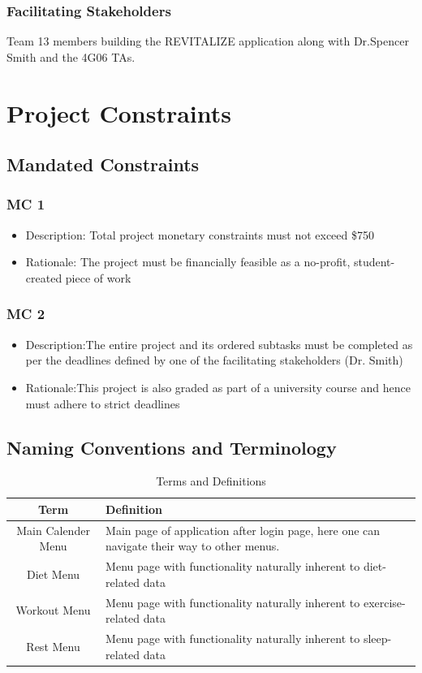 \documentclass[12pt,letterpaper]{article}
\begin{document}
\subsubsection{Facilitating Stakeholders}
Team 13 members building the REVITALIZE application along with Dr.Spencer Smith and the 4G06 TAs.

\section{Project Constraints}
\subsection{Mandated Constraints}
\subsubsection{MC 1}
\begin{itemize}
\item Description: Total project monetary constraints must not exceed \$750\\
\item Rationale: The project must be financially feasible as a no-profit, student-created piece of work
\end{itemize}

\subsubsection{MC 2}
\begin{itemize}
\item Description:The entire project and its ordered subtasks must be completed as per the deadlines defined by one of the facilitating stakeholders (Dr. Smith)
\item Rationale:This project is also graded as part of a university course and hence must adhere to strict deadlines
\end{itemize}

\subsection{Naming Conventions and Terminology}
\label{sub:Naming Conventions and Terminology}
\begin{table}[H]
\caption{Terms and Definitions}
\centering
\begin{tabular}{|c|p{10cm}|}
\hline
\textbf{Term} & \textbf{Definition}\\
\hline
Main Calender Menu & Main page of application after login page, here one can navigate their way to other menus.\\
\hline
Diet Menu & Menu page with functionality naturally inherent to diet-related data\\
\hline
Workout Menu & Menu page with functionality naturally inherent to exercise-related data\\
\hline
Rest Menu &Menu page with functionality naturally inherent to sleep-related data\\
\hline
\end{tabular}
\end{table}
\end{document}
